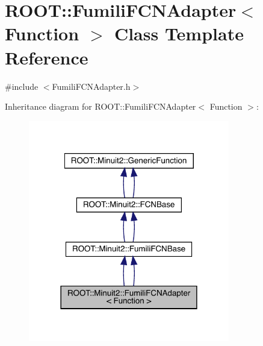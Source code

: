 \hypertarget{classROOT_1_1Minuit2_1_1FumiliFCNAdapter}{}\section{R\+O\+OT\+:\+:Fumili\+F\+C\+N\+Adapter$<$ Function $>$ Class Template Reference}
\label{classROOT_1_1Minuit2_1_1FumiliFCNAdapter}


{\ttfamily \#include $<$Fumili\+F\+C\+N\+Adapter.\+h$>$}



Inheritance diagram for R\+O\+OT\+:\+:Fumili\+F\+C\+N\+Adapter$<$ Function $>$\+:\nopagebreak
\begin{figure}[H]
\begin{center}
\leavevmode
\includegraphics[width=249pt]{de/d6d/classROOT_1_1Minuit2_1_1FumiliFCNAdapter__inherit__graph}
\end{center}
\end{figure}


